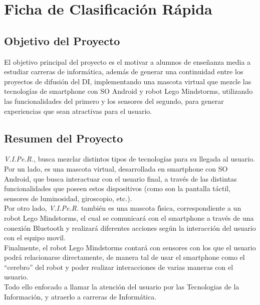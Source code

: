 \documentclass[letterpaper,12pt]{article} %
\numberwithin{equation}{section} %
\numberwithin{figure}{section} %
\numberwithin{table}{section} %
\begin{document}
\setcounter{page}{1} %

\tableofcontents
\newpage

\section{Ficha de Clasificaci\'on R\'apida}
\subsection{Objetivo del Proyecto} %
El objetivo principal del proyecto es el motivar a alumnos de ense\~nanza media a estudiar carreras de inform\'atica, adem\'as de generar una continuidad entre los proyectos de difusi\'on del DI, implementando una mascota virtual que mezcle las tecnolog\'ias de smartphone con SO Android y robot Lego Mindstorms, utilizando las funcionalidades del primero y los sensores del segundo, para generar experiencias que sean atractivas para el usuario.\\

\subsection{Resumen del Proyecto} %

\emph{V.I.Pe.R.}, busca mezclar distintos tipos de tecnolog\'ias para su llegada al usuario.\\

Por un lado, es una mascota virtual, desarrollada en smartphone con SO Android, que busca interactuar con el usuario final, a trav\'es de las distintas funcionalidades que poseen estos dispositivos (como son la pantalla t\'actil, sensores de luminosidad, giroscopio, etc.).\\

Por otro lado, \emph{V.I.Pe.R.} tambi\'en es una mascota f\'{\i}sica, correspondiente a un robot Lego Mindstorms, el cual se comunicar\'a con el smartphone a trav\'es de una conexi\'on Bluetooth y realizar\'a diferentes acciones seg\'un la interacci\'on del usuario con el equipo movil.\\

Finalmente, el robot Lego Mindstorms contar\'a con sensores con los que el usuario podr\'a relacionarse directamente, de manera tal de usar el smartphone como el ``cerebro'' del robot y poder realizar interacciones de varias maneras con el usuario.\\

Todo ello enfocado a llamar la atenci\'on del usuario por las Tecnologias de la Informaci\'on, y atraerlo a carreras de Inform\'atica.\\
\end{document}

